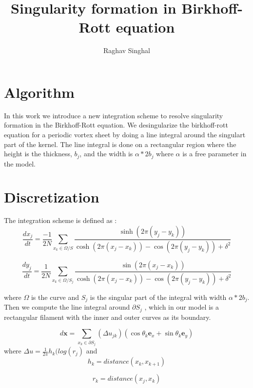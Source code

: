 \documentclass[12pt,twoside]{article}
\newcommand{\bs}  [1]{\boldsymbol{#1}}
\begin{document}
\title{Singularity formation in Birkhoff-Rott equation}


\author{Raghav Singhal}

\maketitle
\section{Algorithm}
In this work we introduce a new integration scheme to resolve singularity formation in the Birkhoff-Rott equation. We desingularize the birkhoff-rott equation for a periodic vortex sheet by doing a line integral around the singulart part of the kernel. The line integral is done on a rectangular region where the height is the thickness, $b_j$, and the width is $\alpha*2b_j$ where $\alpha$ is a free parameter in the model. 

\section{Discretization}
The integration scheme is defined as :
\begin{equation}
\frac{dx_j}{dt}=\frac{-1}{2N} \sum_{x_k \in \Omega /S} \frac{\sinh(2\pi(y_j - y_k))}{\cosh(2\pi(x_j - x_k)) - \cos(2\pi(y_j - y_k)) + \delta^2}
\end{equation}

\begin{equation}
\frac{dy_j}{dt}=\frac{1}{2N} \sum_{x_k \in \Omega /S_j} \frac{\sin(2\pi(x_j - x_k))}{\cosh(2\pi(x_j - x_k)) - \cos(2\pi(y_j - y_k)) + \delta^2}
\end{equation}

where $\Omega$ is the curve  and $S_j$ is the singular part of the integral with width $\alpha*2b_j$. Then we compute the line integral around $\partial S_j$ , which in our model is a rectangular filament with the inner and outer curves as its boundary.

\begin{equation}
d\bs x=\sum_{x_k \in \partial S_j}(\Delta u_{jk})(\cos\theta_k\bs e_x + \sin\theta_k \bs e_y)
\end{equation}
where $\Delta u=\frac{1}{2\pi}h_k(log(r_j)$ and 
\begin{equation}
h_k=distance(x_k,x_{k+1})
\end{equation}

\begin{equation}
r_k=distance(x_j,x_k)
\end{equation}
\end{document}
